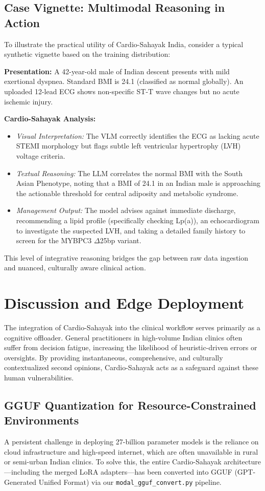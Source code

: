 \documentclass[11pt,a4paper]{article}
\begin{document}
\subsection{Case Vignette: Multimodal Reasoning in Action}
To illustrate the practical utility of Cardio-Sahayak India, consider a typical synthetic vignette based on the training distribution:

\textbf{Presentation:} A 42-year-old male of Indian descent presents with mild exertional dyspnea. Standard BMI is 24.1 (classified as normal globally). An uploaded 12-lead ECG shows non-specific ST-T wave changes but no acute ischemic injury. 

\textbf{Cardio-Sahayak Analysis:}
\begin{itemize}
    \item \textit{Visual Interpretation:} The VLM correctly identifies the ECG as lacking acute STEMI morphology but flags subtle left ventricular hypertrophy (LVH) voltage criteria.
    \item \textit{Textual Reasoning:} The LLM correlates the normal BMI with the South Asian Phenotype, noting that a BMI of 24.1 in an Indian male is approaching the actionable threshold for central adiposity and metabolic syndrome. 
    \item \textit{Management Output:} The model advises against immediate discharge, recommending a lipid profile (specifically checking Lp(a)), an echocardiogram to investigate the suspected LVH, and taking a detailed family history to screen for the MYBPC3 $\Delta$25bp variant.
\end{itemize}
This level of integrative reasoning bridges the gap between raw data ingestion and nuanced, culturally aware clinical action.

\section{Discussion and Edge Deployment}

The integration of Cardio-Sahayak into the clinical workflow serves primarily as a cognitive offloader. General practitioners in high-volume Indian clinics often suffer from decision fatigue, increasing the likelihood of heuristic-driven errors or oversights. By providing instantaneous, comprehensive, and culturally contextualized second opinions, Cardio-Sahayak acts as a safeguard against these human vulnerabilities.

\subsection{GGUF Quantization for Resource-Constrained Environments}
A persistent challenge in deploying 27-billion parameter models is the reliance on cloud infrastructure and high-speed internet, which are often unavailable in rural or semi-urban Indian clinics. To solve this, the entire Cardio-Sahayak architecture---including the merged LoRA adapters---has been converted into GGUF (GPT-Generated Unified Format) via our \texttt{modal\_gguf\_convert.py} pipeline. 
\end{document}
